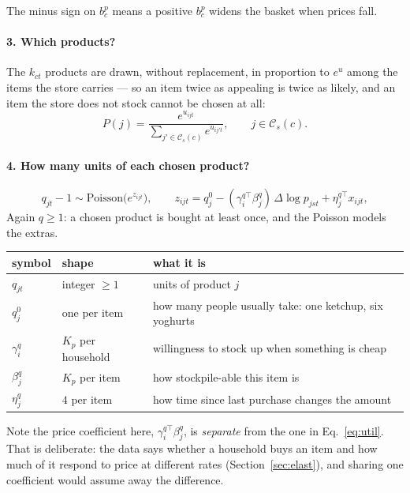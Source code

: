 \documentclass[11pt]{article}
\begin{document}
The minus sign on $b^p_c$ means a positive $b^p_c$ widens the basket when prices fall.

\paragraph{3. Which products?} The $k_{ct}$ products are drawn, without replacement, in
proportion to $e^{u}$ among the items the store carries --- so an item twice as appealing
is twice as likely, and an item the store does not stock cannot be chosen at all:
\begin{equation}
P(j)=\frac{e^{u_{ijt}}}{\sum_{j'\in\mathcal{C}_s(c)}e^{u_{ij't}}},\qquad j\in\mathcal{C}_s(c).
\label{eq:alloc}
\end{equation}

\paragraph{4. How many units of each chosen product?}
\begin{equation}
q_{jt}-1\sim\mathrm{Poisson}\bigl(e^{z_{ijt}}\bigr),\qquad
z_{ijt}=q^0_j-(\gamma^{q\top}_i\beta^q_j)\,\Delta\log p_{jst}+\eta^{q\top}_j x_{ijt},
\label{eq:qty}
\end{equation}
Again $q\ge1$: a chosen product is bought at least once, and the Poisson models the
extras.

\begin{center}
\begin{tabular}{lll}
\toprule
symbol & shape & what it is \\
\midrule
$q_{jt}$ & integer $\ge1$ & units of product $j$ \\
$q^0_j$ & one per item & how many people usually take: one ketchup, six yoghurts \\
$\gamma^q_i$ & $K_p$ per household & willingness to stock up when something is cheap \\
$\beta^q_j$ & $K_p$ per item & how stockpile-able this item is \\
$\eta^q_j$ & $4$ per item & how time since last purchase changes the amount \\
\bottomrule
\end{tabular}
\end{center}

Note the price coefficient here, $\gamma^{q\top}_i\beta^q_j$, is \emph{separate} from the
one in Eq.~\ref{eq:util}. That is deliberate: the data says
whether a household buys an item and how much of it respond to price at different rates
(Section~\ref{sec:elast}), and sharing one coefficient would assume away the difference.
\end{document}
